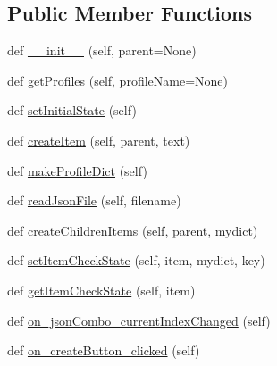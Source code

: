 \subsection*{Public Member Functions}
\begin{DoxyCompactItemize}
\item 
def \mbox{\hyperlink{class_dsg_tools_1_1_user_tools_1_1profile__editor_1_1_profile_editor_a55f5ced4df1165a00e9a7e6124bae983}{\+\_\+\+\_\+init\+\_\+\+\_\+}} (self, parent=None)
\item 
def \mbox{\hyperlink{class_dsg_tools_1_1_user_tools_1_1profile__editor_1_1_profile_editor_ae315bbaa474d1424260898dc694e43a7}{get\+Profiles}} (self, profile\+Name=None)
\item 
def \mbox{\hyperlink{class_dsg_tools_1_1_user_tools_1_1profile__editor_1_1_profile_editor_aca19b2e056761a396c13ad60233397c7}{set\+Initial\+State}} (self)
\item 
def \mbox{\hyperlink{class_dsg_tools_1_1_user_tools_1_1profile__editor_1_1_profile_editor_a8a7577475a8e31d1d758fc4568d5818a}{create\+Item}} (self, parent, text)
\item 
def \mbox{\hyperlink{class_dsg_tools_1_1_user_tools_1_1profile__editor_1_1_profile_editor_af7901665e57b8aee60db84aaf50c08da}{make\+Profile\+Dict}} (self)
\item 
def \mbox{\hyperlink{class_dsg_tools_1_1_user_tools_1_1profile__editor_1_1_profile_editor_ae0b939974176fcb27653d2af4bdf7234}{read\+Json\+File}} (self, filename)
\item 
def \mbox{\hyperlink{class_dsg_tools_1_1_user_tools_1_1profile__editor_1_1_profile_editor_a4570169729936da5eefeb4db5878c7e4}{create\+Children\+Items}} (self, parent, mydict)
\item 
def \mbox{\hyperlink{class_dsg_tools_1_1_user_tools_1_1profile__editor_1_1_profile_editor_a3f9cd05ae470a2908067412452d2c0f9}{set\+Item\+Check\+State}} (self, item, mydict, key)
\item 
def \mbox{\hyperlink{class_dsg_tools_1_1_user_tools_1_1profile__editor_1_1_profile_editor_a1b792eeaccf84be33cabd36287492265}{get\+Item\+Check\+State}} (self, item)
\item 
def \mbox{\hyperlink{class_dsg_tools_1_1_user_tools_1_1profile__editor_1_1_profile_editor_a57f897fed81656d7ed6fe6ca0ce5012d}{on\+\_\+json\+Combo\+\_\+current\+Index\+Changed}} (self)
\item 
def \mbox{\hyperlink{class_dsg_tools_1_1_user_tools_1_1profile__editor_1_1_profile_editor_a42c11c275b6677c56a5c1dd42e553890}{on\+\_\+create\+Button\+\_\+clicked}} (self)

\end{DoxyCompactItemize}
